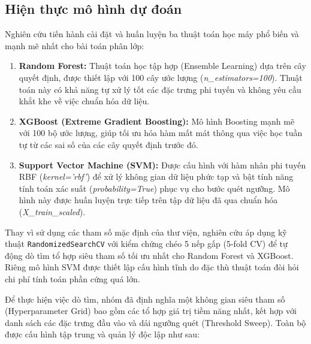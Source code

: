 \subsection{Hiện thực mô hình dự đoán}
Nghiên cứu tiến hành cài đặt và huấn luyện ba thuật toán học máy phổ biến và mạnh mẽ nhất cho bài toán phân lớp:
\begin{enumerate}
    \item \textbf{Random Forest:} Thuật toán học tập hợp (Ensemble Learning) dựa trên cây quyết định, được thiết lập với 100 cây ước lượng (\textit{n\_estimators=100}). Thuật toán này có khả năng tự xử lý tốt các đặc trưng phi tuyến và không yêu cầu khắt khe về việc chuẩn hóa dữ liệu.
    \item \textbf{XGBoost (Extreme Gradient Boosting):} Mô hình Boosting mạnh mẽ với 100 bộ ước lượng, giúp tối ưu hóa hàm mất mát thông qua việc học tuần tự từ các sai số của các cây quyết định trước đó.
    \item \textbf{Support Vector Machine (SVM):} Được cấu hình với hàm nhân phi tuyến RBF (\textit{kernel='rbf'}) để xử lý không gian dữ liệu phức tạp và bật tính năng tính toán xác suất (\textit{probability=True}) phục vụ cho bước quét ngưỡng. Mô hình này được huấn luyện trực tiếp trên tập dữ liệu đã qua chuẩn hóa (\textit{X\_train\_scaled}).
\end{enumerate}

Thay vì sử dụng các tham số mặc định của thư viện, nghiên cứu áp dụng kỹ thuật \texttt{RandomizedSearchCV} với kiểm chứng chéo 5 nếp gấp (5-fold CV) để tự động dò tìm tổ hợp siêu tham số tối ưu nhất cho Random Forest và XGBoost. Riêng mô hình SVM được thiết lập cấu hình tĩnh do đặc thù thuật toán đòi hỏi chi phí tính toán phần cứng quá lớn.

\hspace{17pt}Để thực hiện việc dò tìm, nhóm đã định nghĩa một không gian siêu tham số (Hyperparameter Grid) bao gồm các tổ hợp giá trị tiềm năng nhất, kết hợp với danh sách các đặc trưng đầu vào và dải ngưỡng quét (Threshold Sweep). Toàn bộ được cấu hình tập trung và quản lý độc lập như sau:

